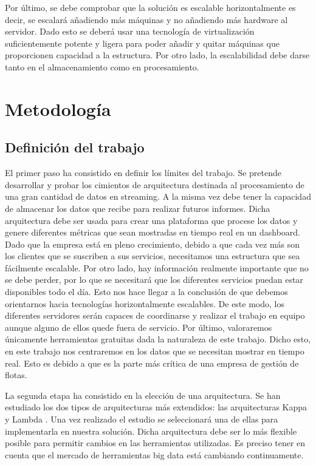 Por último, se debe comprobar que la solución es escalable
horizontalmente es decir, se escalará añadiendo más máquinas y no
añadiendo más hardware al servidor. Dado esto se deberá usar una
tecnología de virtualización suficientemente potente y ligera para
poder añadir y quitar máquinas que proporcionen capacidad a la
estructura. Por otro lado, la escalabilidad debe darse tanto en el
almacenamiento como en procesamiento.



\section{Metodología\label{metodologia}}

\subsection{Definición del trabajo\label{etapasTrab}}

El primer paso ha consistido en definir los límites del trabajo. Se
pretende desarrollar y probar los cimientos de arquitectura destinada
al procesamiento de una gran cantidad de datos en streaming. A la
misma vez debe tener la capacidad de almacenar los datos que recibe
para realizar futuros informes. Dicha arquitectura debe ser usada para
crear una plataforma que procese los datos y genere diferentes
métricas que sean mostradas en tiempo real en un dashboard. Dado que
la empresa \mdata{} está en pleno crecimiento, debido a que cada vez
más son los clientes que se suscriben a sus servicios, necesitamos una
estructura que sea fácilmente escalable. Por otro lado, hay
información realmente importante que no se debe perder, por lo que se
necesitará que los diferentes servicios puedan estar disponibles todo
el día. Esto nos hace llegar a la conclusión de que debemos
orientarnos hacia tecnologías horizontalmente escalables. De este
modo, los diferentes servidores serán capaces de coordinarse y
realizar el trabajo en equipo aunque alguno de ellos quede fuera de
servicio. Por último, valoraremos únicamente herramientas gratuitas
dada la naturaleza de este trabajo. Dicho esto, en este trabajo nos
centraremos en los datos que se necesitan mostrar en tiempo real. Esto
es debido a que es la parte más crítica de una empresa de gestión de
flotas.

La segunda etapa ha consistido en la elección de una arquitectura. Se
han estudiado los dos tipos de arquitecturas más extendidos: las
arquitecturas Kappa y Lambda \cite{LambdaKappa2}. Una vez realizado el
estudio se seleccionará una de ellas para implementarla en nuestra
solución. Dicha arquitectura debe ser lo más flexible posible para
permitir cambios en las herramientas utilizadas. Es preciso tener en
cuenta que el mercado de herramientas big data está cambiando
continuamente.

